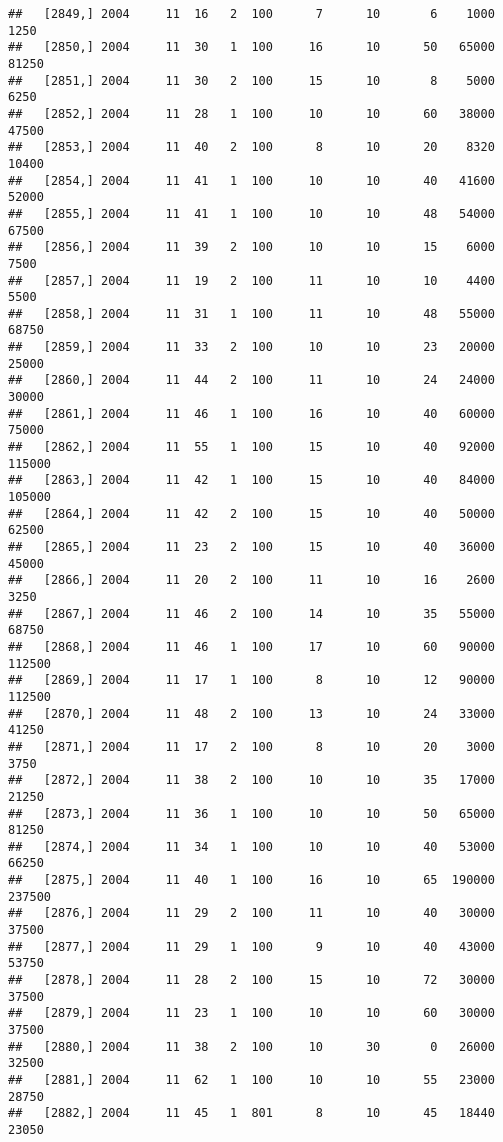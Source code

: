 \documentclass{article}\usepackage[]{graphicx}\usepackage[]{color}
\makeatletter
\newenvironment{kframe}{%
 \def\at@end@of@kframe{}%
 \ifinner\ifhmode%
  \def\at@end@of@kframe{\end{minipage}}%
  \begin{minipage}{\columnwidth}%
 \fi\fi%
 \def\FrameCommand##1{\hskip\@totalleftmargin \hskip-\fboxsep
 \colorbox{shadecolor}{##1}\hskip-\fboxsep
     \hskip-\linewidth \hskip-\@totalleftmargin \hskip\columnwidth}%
 \MakeFramed {\advance\hsize-\width
   \@totalleftmargin\z@ \linewidth\hsize
   \@setminipage}}%
 {\par\unskip\endMakeFramed%
 \at@end@of@kframe}
\newenvironment{knitrout}{}{} %
\makeatother
\begin{document}
\begin{knitrout}
\begin{kframe}
\begin{verbatim}
##   [2849,] 2004     11  16   2  100      7      10       6    1000    1250
##   [2850,] 2004     11  30   1  100     16      10      50   65000   81250
##   [2851,] 2004     11  30   2  100     15      10       8    5000    6250
##   [2852,] 2004     11  28   1  100     10      10      60   38000   47500
##   [2853,] 2004     11  40   2  100      8      10      20    8320   10400
##   [2854,] 2004     11  41   1  100     10      10      40   41600   52000
##   [2855,] 2004     11  41   1  100     10      10      48   54000   67500
##   [2856,] 2004     11  39   2  100     10      10      15    6000    7500
##   [2857,] 2004     11  19   2  100     11      10      10    4400    5500
##   [2858,] 2004     11  31   1  100     11      10      48   55000   68750
##   [2859,] 2004     11  33   2  100     10      10      23   20000   25000
##   [2860,] 2004     11  44   2  100     11      10      24   24000   30000
##   [2861,] 2004     11  46   1  100     16      10      40   60000   75000
##   [2862,] 2004     11  55   1  100     15      10      40   92000  115000
##   [2863,] 2004     11  42   1  100     15      10      40   84000  105000
##   [2864,] 2004     11  42   2  100     15      10      40   50000   62500
##   [2865,] 2004     11  23   2  100     15      10      40   36000   45000
##   [2866,] 2004     11  20   2  100     11      10      16    2600    3250
##   [2867,] 2004     11  46   2  100     14      10      35   55000   68750
##   [2868,] 2004     11  46   1  100     17      10      60   90000  112500
##   [2869,] 2004     11  17   1  100      8      10      12   90000  112500
##   [2870,] 2004     11  48   2  100     13      10      24   33000   41250
##   [2871,] 2004     11  17   2  100      8      10      20    3000    3750
##   [2872,] 2004     11  38   2  100     10      10      35   17000   21250
##   [2873,] 2004     11  36   1  100     10      10      50   65000   81250
##   [2874,] 2004     11  34   1  100     10      10      40   53000   66250
##   [2875,] 2004     11  40   1  100     16      10      65  190000  237500
##   [2876,] 2004     11  29   2  100     11      10      40   30000   37500
##   [2877,] 2004     11  29   1  100      9      10      40   43000   53750
##   [2878,] 2004     11  28   2  100     15      10      72   30000   37500
##   [2879,] 2004     11  23   1  100     10      10      60   30000   37500
##   [2880,] 2004     11  38   2  100     10      30       0   26000   32500
##   [2881,] 2004     11  62   1  100     10      10      55   23000   28750
##   [2882,] 2004     11  45   1  801      8      10      45   18440   23050

\end{verbatim}
\end{kframe}
\end{knitrout}
\end{document}
